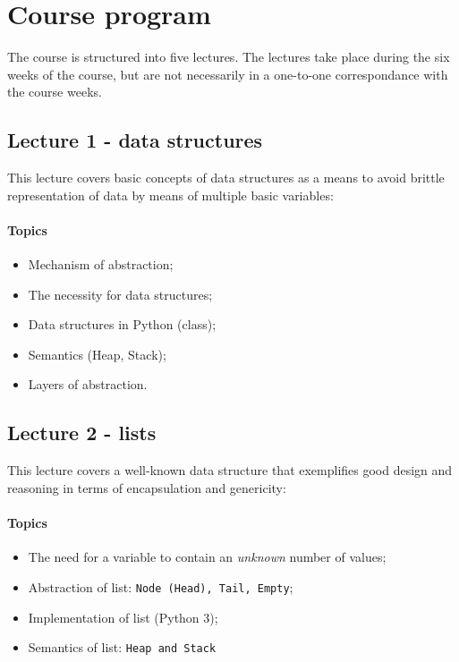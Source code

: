 \section{Course program}
	The course is structured into five lectures. The lectures take place during the six weeks of the course, but are not necessarily in a one-to-one correspondance with the course weeks.

	\subsection{Lecture 1 - data structures}
		This lecture covers basic concepts of data structures as a means to avoid brittle representation of data by means of multiple basic variables:

		\paragraph*{Topics}
			\begin{itemize}
				\item Mechanism of abstraction;
				\item The necessity for data structures;
				\item Data structures in Python (class);
				\item Semantics (Heap, Stack);
				\item Layers of abstraction.
			\end{itemize}

			\subsection{Lecture 2 - lists}
				This lecture covers a well-known data structure that exemplifies good design and reasoning in terms of encapsulation and genericity:

				\paragraph*{Topics}
					\begin{itemize}
						\item The need for a variable to contain an \textit{unknown} number of values;
						\item Abstraction of list: \texttt{Node (Head), Tail, Empty};
						\item Implementation of list (Python 3);
						\item Semantics of list: \texttt{Heap and Stack}
					\end{itemize}
				
